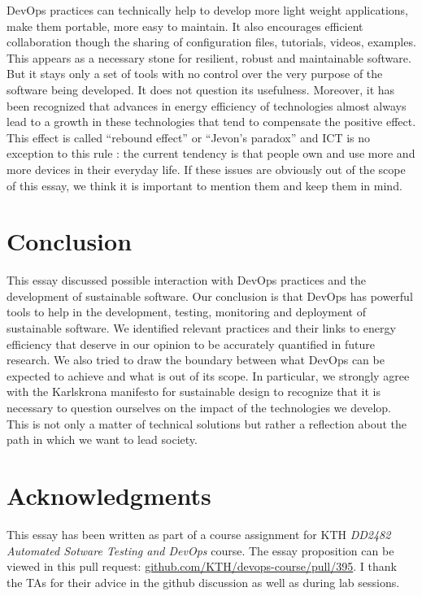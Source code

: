 \documentclass[11pt,twocolumn]{article}
\begin{document}
DevOps practices can technically help to develop more light weight applications, make them portable, more easy to maintain. It also encourages efficient collaboration though the sharing of configuration files, tutorials, videos, examples. This appears as a necessary stone for resilient, robust and maintainable software. But it stays only a set of tools with no control over the very purpose of the software being developed. It does not question its usefulness. Moreover, it has been recognized that advances in energy efficiency of technologies almost always lead to a growth in these technologies that tend to compensate the positive effect. This effect is called ``rebound effect'' or ``Jevon's paradox'' and ICT is no exception to this rule \cite{gossartReboundEffectsICT2015}: the current tendency is that people own and use more and more devices in their everyday life. If these issues are obviously out of the scope of this essay, we think it is important to mention them and keep them in mind.

\section{Conclusion}
This essay discussed possible interaction with DevOps practices and the development of sustainable software. Our conclusion is that DevOps has powerful tools to help in the development, testing, monitoring and deployment of sustainable software. We identified relevant practices and their links to energy efficiency that deserve in our opinion to be accurately quantified in future research. We also tried to draw the boundary between what DevOps can be expected to achieve and what is out of its scope. In particular, we strongly agree with the Karlskrona manifesto for sustainable design \cite{beckerSustainabilityDesignSoftware2015} to recognize that it is necessary to question ourselves on the impact of the technologies we develop. This is not only a matter of technical solutions but rather a reflection about the path in which we want to lead society.


\section*{Acknowledgments}
This essay has been written as part of a course assignment for KTH \textit{DD2482 Automated Sotware Testing and DevOps} course. The essay proposition can be viewed in this pull request: \url{github.com/KTH/devops-course/pull/395}. I thank the TAs for their advice in the github discussion as well as during lab sessions.

\printbibliography
\end{document}
